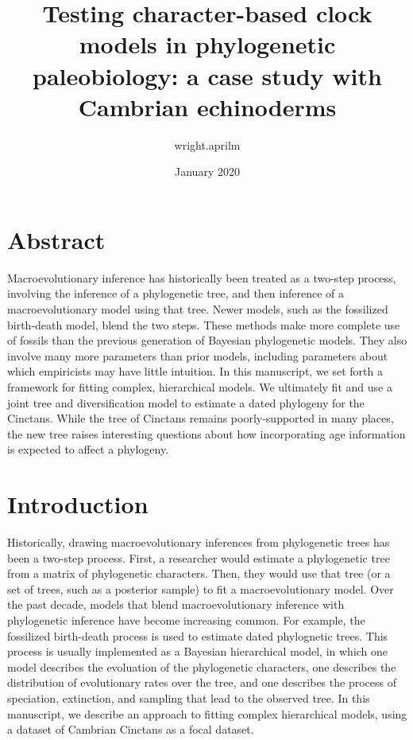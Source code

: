 \documentclass{article}
\title{Testing character-based clock models in phylogenetic paleobiology: a case study with Cambrian echinoderms}
\author{wright.aprilm }
\date{January 2020}
\begin{document}
\maketitle

\section{Abstract}

Macroevolutionary inference has historically been treated as a two-step process, involving the inference of a phylogenetic tree, and then inference of a macroevolutionary model using that tree.
Newer models, such as the fossilized birth-death model, blend the two steps.
These methods make more complete use of fossils than the previous generation of Bayesian phylogenetic models.
They also involve many more parameters than prior models, including parameters about which empiricists may have little intuition.
In this manuscript, we set forth a framework for fitting complex, hierarchical models.
We ultimately fit and use a joint tree and diversification model to estimate a dated phylogeny for the Cinctans.
While the tree of Cinctans remains poorly-supported in many places, the new tree raises interesting questions about how incorporating age information is expected to affect a phylogeny.

\section{Introduction}

Historically, drawing macroevolutionary inferences from phylogenetic trees has been a two-step process.
First, a researcher would estimate a phylogenetic tree from a matrix of phylogenetic characters.
Then, they would use that tree (or a set of trees, such as a posterior sample) to fit a macroevolutionary model.
Over the past decade, models that blend macroevolutionary inference with phylogenetic inference have become increasing common.
For example, the fossilized birth-death process is used to estimate dated phylognetic trees.
This process is usually implemented as a Bayesian hierarchical model, in which one model describes the evoluation of the phylogenetic characters, one describes the distribution of evolutionary rates over the tree, and one describes the process of speciation, extinction, and sampling that lead to the observed tree.
In this manuscript, we describe an approach to fitting complex hierarchical models, using a dataset of Cambrian Cinctans as a focal dataset.
\end{document}
